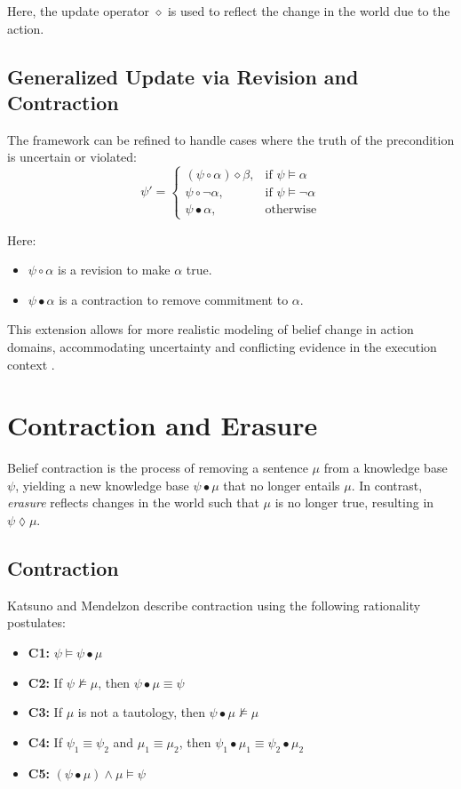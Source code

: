 \documentclass[runningheads]{llncs}
\begin{document}
Here, the update operator \( \diamond \) is used to reflect the change in the world due to the action.

\subsection{Generalized Update via Revision and Contraction}

The framework can be refined to handle cases where the truth of the precondition is uncertain or violated:
\[
\psi' =
\begin{cases}
(\psi \circ \alpha) \diamond \beta, & \text{if } \psi \models \alpha \\
\psi \circ \neg \alpha, & \text{if } \psi \models \neg \alpha \\
\psi \bullet \alpha, & \text{otherwise}
\end{cases}
\]

Here:
\begin{itemize}
    \item \( \psi \circ \alpha \) is a revision to make \( \alpha \) true.
    \item \( \psi \bullet \alpha \) is a contraction to remove commitment to \( \alpha \).
\end{itemize}

This extension allows for more realistic modeling of belief change in action domains, accommodating uncertainty and conflicting evidence in the execution context \cite{katsuno}.

\section{Contraction and Erasure}

Belief contraction is the process of removing a sentence \( \mu \) from a knowledge base \( \psi \), yielding a new knowledge base \( \psi \bullet \mu \) that no longer entails \( \mu \). In contrast, \emph{erasure} reflects changes in the world such that \( \mu \) is no longer true, resulting in \( \psi \lozenge \mu \).

\subsection{Contraction}

Katsuno and Mendelzon describe contraction using the following rationality postulates:

\begin{itemize}
    \item \textbf{C1:} \( \psi \models \psi \bullet \mu \)
    \item \textbf{C2:} If \( \psi \not\models \mu \), then \( \psi \bullet \mu \equiv \psi \)
    \item \textbf{C3:} If \( \mu \) is not a tautology, then \( \psi \bullet \mu \not\models \mu \)
    \item \textbf{C4:} If \( \psi_1 \equiv \psi_2 \) and \( \mu_1 \equiv \mu_2 \), then \( \psi_1 \bullet \mu_1 \equiv \psi_2 \bullet \mu_2 \)
    \item \textbf{C5:} \( (\psi \bullet \mu) \land \mu \models \psi \)
\end{itemize}
\end{document}

